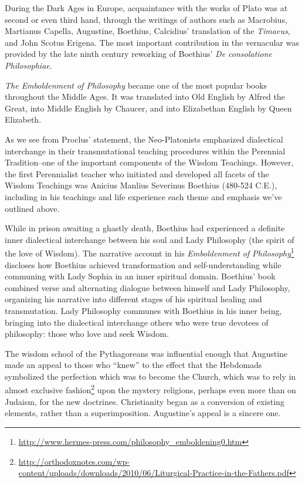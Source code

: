 \begin{quotex}
During the Dark Ages in Europe, acquaintance with the works of Plato was at second or even third hand, through the writings of authors such as Macrobius, Martianus Capella, Augustine, Boethius, Calcidius' translation of the \emph{Timaeus}, and John Scotus Erigena. The most important contribution in the vernacular was provided by the late ninth century reworking of Boethius' \emph{De consolatione Philosophiae}.
\end{quotex}


\emph{The Emboldenment of Philosophy} became one of the most popular books throughout the Middle Ages. It was translated into Old English by Alfred the Great, into Middle English by Chaucer, and into Elizabethan English by Queen Elizabeth.

As we see from Proclus' statement, the Neo-Platonists emphasized dialectical interchange in their transmutational teaching procedures within the Perennial Tradition--one of the important components of the Wisdom Teachings. However, the first Perennialist teacher who initiated and developed all facets of the Wisdom Teachings was Anicius Manlius Severinus Boethius (480-524 C.E.), including in his teachings and life experience each theme and emphasis we've outlined above.

While in prison awaiting a ghastly death, Boethius had experienced a definite inner dialectical interchange between his soul and Lady Philosophy (the spirit of the love of Wisdom). The narrative account in his \emph{Emboldenment of Philosophy}\footnote{\url{http://www.hermes-press.com/philosophy\_emboldening0.htm}} discloses how Boethius achieved transformation and self-understanding while communing with Lady Sophia in an inner spiritual domain. Boethius' book combined verse and alternating dialogue between himself and Lady Philosophy, organizing his narrative into different stages of his spiritual healing and transmutation. Lady Philosophy communes with Boethius in his inner being, bringing into the dialectical interchange others who were true devotees of philosophy: those who love and seek Wisdom.

The wisdom school of the Pythagoreans was influential enough that Augustine made an appeal to those who ``knew'' to the effect that the Hebdomads symbolized the perfection which was to become the Church, which was to rely in almost exclusive fashion\footnote{\url{http://orthodoxnotes.com/wp-content/uploads/downloads/2010/06/Liturgical-Practice-in-the-Fathers.pdf}} upon the mystery religions, perhaps even more than on Judaism, for the new doctrines. Christianity began as a conversion of existing elements, rather than a superimposition. Augustine's appeal is a sincere one.

